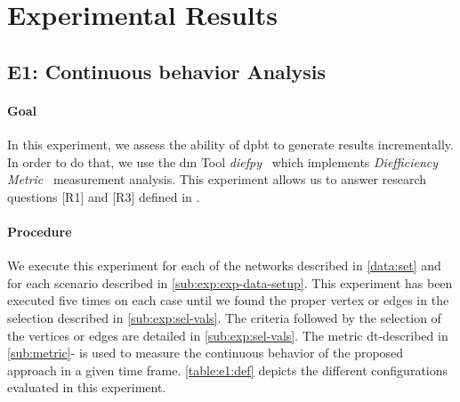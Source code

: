 \section{Experimental Results}\label{sec:exp:observed-results}
\subsection{E1: Continuous behavior Analysis}\label{sub:sec:exp-1} 
\paragraph{Goal} In this experiment, we assess the ability of \acrshort{dpbt} to generate results incrementally.
In order to do that, we use the \acrfull{dm} Tool \emph{diefpy}~\cite{diefpy} which implements \emph{Diefficiency Metric}~\cite{diefpaper} measurement analysis.
This experiment allows us to answer research questions [R1] and [R3] defined in . 

\paragraph{Procedure} We execute this experiment for each of the networks described in \autoref{data:set} and for each scenario described in \autoref{sub:exp:exp-data-setup}.
This experiment has been executed five times on each case until we found the proper vertex or edges in the selection described in \autoref{sub:exp:sel-vals}. The criteria followed by the selection of the vertices or edges are detailed in \autoref{sub:exp:sel-vals}.
The metric  \acrfull{dt}-described in \autoref{sub:metric}- is used to measure the continuous behavior of the proposed approach in a given time frame.
\autoref{table:e1:def} depicts the different configurations evaluated in this experiment.

